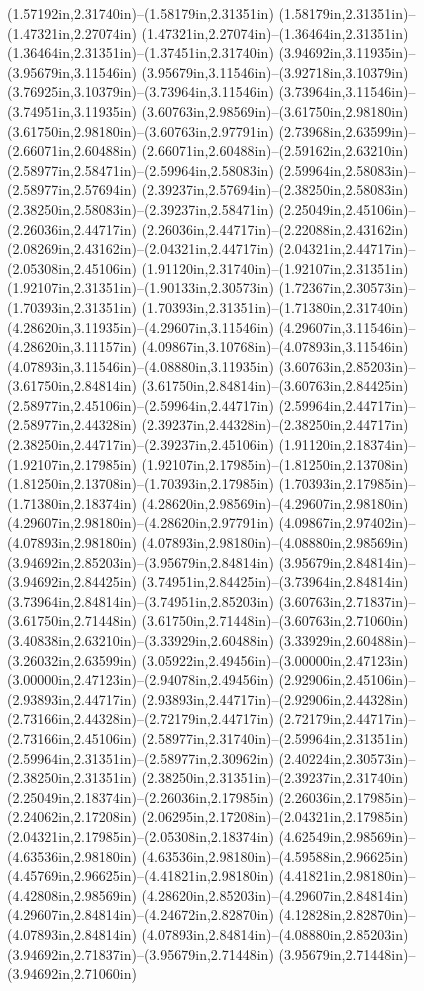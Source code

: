 (1.57192in,2.31740in)--(1.58179in,2.31351in) (1.58179in,2.31351in)--(1.47321in,2.27074in) (1.47321in,2.27074in)--(1.36464in,2.31351in) (1.36464in,2.31351in)--(1.37451in,2.31740in) (3.94692in,3.11935in)--(3.95679in,3.11546in) (3.95679in,3.11546in)--(3.92718in,3.10379in) (3.76925in,3.10379in)--(3.73964in,3.11546in) (3.73964in,3.11546in)--(3.74951in,3.11935in) (3.60763in,2.98569in)--(3.61750in,2.98180in) (3.61750in,2.98180in)--(3.60763in,2.97791in) (2.73968in,2.63599in)--(2.66071in,2.60488in) (2.66071in,2.60488in)--(2.59162in,2.63210in) (2.58977in,2.58471in)--(2.59964in,2.58083in) (2.59964in,2.58083in)--(2.58977in,2.57694in) (2.39237in,2.57694in)--(2.38250in,2.58083in) (2.38250in,2.58083in)--(2.39237in,2.58471in) (2.25049in,2.45106in)--(2.26036in,2.44717in) (2.26036in,2.44717in)--(2.22088in,2.43162in) (2.08269in,2.43162in)--(2.04321in,2.44717in) (2.04321in,2.44717in)--(2.05308in,2.45106in) (1.91120in,2.31740in)--(1.92107in,2.31351in) (1.92107in,2.31351in)--(1.90133in,2.30573in) (1.72367in,2.30573in)--(1.70393in,2.31351in) (1.70393in,2.31351in)--(1.71380in,2.31740in) (4.28620in,3.11935in)--(4.29607in,3.11546in) (4.29607in,3.11546in)--(4.28620in,3.11157in) (4.09867in,3.10768in)--(4.07893in,3.11546in) (4.07893in,3.11546in)--(4.08880in,3.11935in) (3.60763in,2.85203in)--(3.61750in,2.84814in) (3.61750in,2.84814in)--(3.60763in,2.84425in) (2.58977in,2.45106in)--(2.59964in,2.44717in) (2.59964in,2.44717in)--(2.58977in,2.44328in) (2.39237in,2.44328in)--(2.38250in,2.44717in) (2.38250in,2.44717in)--(2.39237in,2.45106in) (1.91120in,2.18374in)--(1.92107in,2.17985in) (1.92107in,2.17985in)--(1.81250in,2.13708in) (1.81250in,2.13708in)--(1.70393in,2.17985in) (1.70393in,2.17985in)--(1.71380in,2.18374in) (4.28620in,2.98569in)--(4.29607in,2.98180in) (4.29607in,2.98180in)--(4.28620in,2.97791in) (4.09867in,2.97402in)--(4.07893in,2.98180in) (4.07893in,2.98180in)--(4.08880in,2.98569in) (3.94692in,2.85203in)--(3.95679in,2.84814in) (3.95679in,2.84814in)--(3.94692in,2.84425in) (3.74951in,2.84425in)--(3.73964in,2.84814in) (3.73964in,2.84814in)--(3.74951in,2.85203in) (3.60763in,2.71837in)--(3.61750in,2.71448in) (3.61750in,2.71448in)--(3.60763in,2.71060in) (3.40838in,2.63210in)--(3.33929in,2.60488in) (3.33929in,2.60488in)--(3.26032in,2.63599in) (3.05922in,2.49456in)--(3.00000in,2.47123in) (3.00000in,2.47123in)--(2.94078in,2.49456in) (2.92906in,2.45106in)--(2.93893in,2.44717in) (2.93893in,2.44717in)--(2.92906in,2.44328in) (2.73166in,2.44328in)--(2.72179in,2.44717in) (2.72179in,2.44717in)--(2.73166in,2.45106in) (2.58977in,2.31740in)--(2.59964in,2.31351in) (2.59964in,2.31351in)--(2.58977in,2.30962in) (2.40224in,2.30573in)--(2.38250in,2.31351in) (2.38250in,2.31351in)--(2.39237in,2.31740in) (2.25049in,2.18374in)--(2.26036in,2.17985in) (2.26036in,2.17985in)--(2.24062in,2.17208in) (2.06295in,2.17208in)--(2.04321in,2.17985in) (2.04321in,2.17985in)--(2.05308in,2.18374in) (4.62549in,2.98569in)--(4.63536in,2.98180in) (4.63536in,2.98180in)--(4.59588in,2.96625in) (4.45769in,2.96625in)--(4.41821in,2.98180in) (4.41821in,2.98180in)--(4.42808in,2.98569in) (4.28620in,2.85203in)--(4.29607in,2.84814in) (4.29607in,2.84814in)--(4.24672in,2.82870in) (4.12828in,2.82870in)--(4.07893in,2.84814in) (4.07893in,2.84814in)--(4.08880in,2.85203in) (3.94692in,2.71837in)--(3.95679in,2.71448in) (3.95679in,2.71448in)--(3.94692in,2.71060in) 